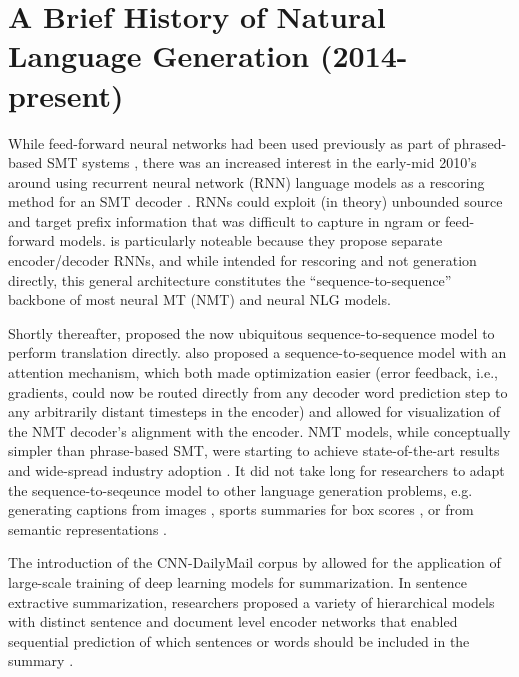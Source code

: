 \section{A Brief History of Natural Language Generation (2014-present)}
  
While feed-forward neural networks had been used previously as part of
phrased-based SMT systems \citep{schwenk2006}, there was an increased interest
in the early-mid 2010's around using recurrent neural network (RNN) language
models \citep{mikolov2010} as a rescoring method for an SMT decoder
\citep{auli2013joint,cho2014learning}.  RNNs could exploit (in theory)
unbounded source and target prefix information that was difficult to capture
in ngram or feed-forward models. \citet{cho2014learning} is particularly
noteable because they propose separate encoder/decoder RNNs, and while
intended for rescoring and not generation directly, this general architecture
constitutes the ``sequence-to-sequence'' backbone of most neural MT (NMT) and
neural NLG models.
  
Shortly thereafter, \citet{sutskever2014sequence} proposed the now ubiquitous
sequence-to-sequence model to perform translation directly.
\citet{bahdanau2015}  also proposed a sequence-to-sequence model with an
attention mechanism, which both made optimization easier (error feedback,
i.e., gradients, could now be routed directly from any decoder word prediction
step to any arbitrarily  distant timesteps in the encoder) and allowed for
visualization of the NMT decoder's alignment with the encoder.  NMT models,
while conceptually simpler than phrase-based SMT, were starting to achieve
state-of-the-art results \citep{bojar2016} and wide-spread industry adoption
\citep{wu2016google,gehring2017}.  It did not take long for researchers to
adapt the sequence-to-seqeunce model to other language generation problems,
e.g. generating captions from images \citep{vinyals2015a}, sports summaries for box scores
\cite{lebret2016,wiseman2017}, or from semantic representations
\citep{wen2015,dusek2016}. 
  
The introduction of the CNN-DailyMail corpus by \cite{hermann2015} allowed for
the application of large-scale training of deep learning models for
summarization. In sentence extractive summarization, researchers proposed 
a variety of hierarchical models with distinct sentence and document
level encoder networks that enabled sequential prediction of which sentences 
or words should be included in the summary \citep{cheng2016neural,nallapati2017summarunner}.


